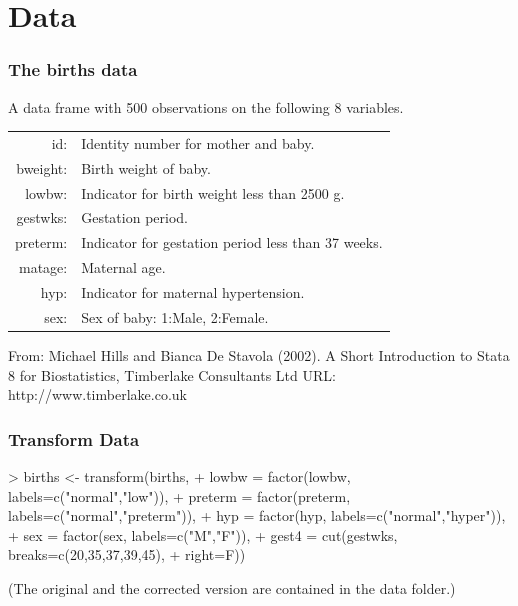 \documentclass[xcolor={table}]{beamer}
\begin{document}
\section{Data}
\begin{frame}\frametitle{The births data}
A data frame with 500 observations on the following 8 variables. 
\begin{center}
\begin{tabular}{@{} >{\ttfamily}r l}
             id: & Identity number for mother and baby.               \\
       bweight: & Birth weight of baby.                              \\
         lowbw: & Indicator for birth weight less than 2500 g.       \\
       gestwks: & Gestation period.                                  \\
       preterm: & Indicator for gestation period less than 37 weeks. \\
        matage: & Maternal age.                                      \\
           hyp: & Indicator for maternal hypertension.               \\
           sex: & Sex of baby: 1:Male, 2:Female.                     \\
\end{tabular}
\end{center}
From: Michael Hills and Bianca De Stavola (2002). A Short Introduction
     to Stata 8 for Biostatistics, Timberlake Consultants Ltd URL:
     http://www.timberlake.co.uk
\end{frame}

\begin{frame}[fragile]\frametitle{Transform Data}
\small
\begin{semiverbatim}
> births <- transform(births,
+       lowbw = factor(lowbw, labels=c("normal","low")),
+       preterm = factor(preterm, labels=c("normal","preterm")),
+       hyp = factor(hyp, labels=c("normal","hyper")),
+       sex = factor(sex, labels=c("M","F")),
+       gest4 = cut(gestwks, breaks=c(20,35,37,39,45),
+       right=F))
\end{semiverbatim}
(The original and the corrected version are contained in the data folder.)
\end{frame}
\end{document}
